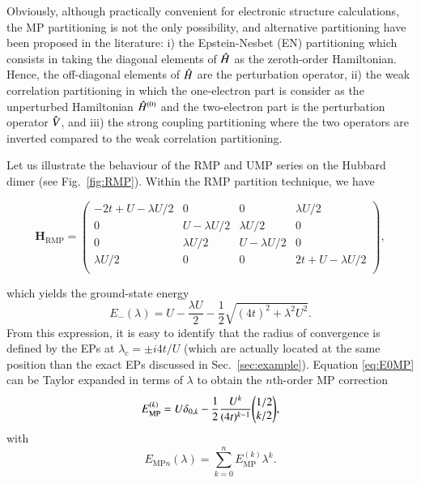 \documentclass[aps,prb,reprint,noshowkeys,superscriptaddress]{revtex4-1}
\newcommand{\bH}{\mathbf{H}}
\newcommand{\hH}{\Hat{H}}
\newcommand{\hV}{\Hat{V}}
\begin{document}
Obviously, although practically convenient for electronic structure calculations, the MP partitioning is not the only possibility, and alternative partitioning have been proposed in the literature:
i) the Epstein-Nesbet (EN) partitioning which consists in taking the diagonal elements of $\hH$ as the zeroth-order Hamiltonian. \cite{Nesbet_1955,Epstein_1926} 
Hence, the off-diagonal elements of $\hH$ are the perturbation operator,
ii) the weak correlation partitioning in which the one-electron part is consider as the unperturbed Hamiltonian $\hH^{(0)}$ and the two-electron part is the perturbation operator $\hV$, and 
iii) the strong coupling partitioning where the two operators are inverted compared to the weak correlation partitioning. \cite{Seidl_2018}


Let us illustrate the behaviour of the RMP and UMP series on the Hubbard dimer (see Fig.~\ref{fig:RMP}).
Within the RMP partition technique, we have 
\begin{widetext}
\begin{equation}
\label{eq:H_RMP}
	\bH_\text{RMP} = 
	\begin{pmatrix}
		-2t + U - \lambda U/2	&	0					&	0					&	\lambda U/2	\\
		0						&	U - \lambda U/2 	&	\lambda U/2			&	0	\\
		0						&	\lambda U/2			&	U - \lambda U/2 	&	0	\\
		\lambda U/2 			&	0 					&	0					&	2t + U - \lambda U/2	\\
	\end{pmatrix},
\end{equation}
\end{widetext}
which yields the ground-state energy 
\begin{equation}
	\label{eq:E0MP}
	E_{-}(\lambda) = U - \frac{\lambda U}{2} - \frac{1}{2} \sqrt{(4t)^2 + \lambda ^2 U^2}.
\end{equation}
From this expression, it is easy to identify that the radius of convergence is defined by the EPs at $\lambda_c = \pm i 4t / U$ (which are actually located at the same position than the exact EPs discussed in Sec.~\ref{sec:example}).
Equation \eqref{eq:E0MP} can be Taylor expanded in terms of $\lambda$ to obtain the $n$th-order MP correction
\begin{equation}
	E_\text{MP}^{(k)} = U \delta_{0,k} - \frac{1}{2} \frac{U^k}{(4t)^{k-1}} \mqty( 1/2 \\ k/2),
\end{equation}
with 
\begin{equation}
	E_{\text{MP}n}(\lambda) = \sum_{k=0}^n E_\text{MP}^{(k)} \lambda^k.
\end{equation}
\end{document}
